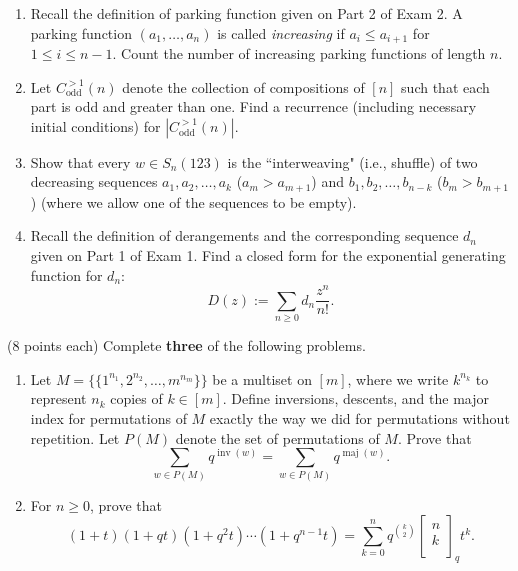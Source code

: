 \documentclass[11pt]{article}
\theoremstyle{definition}
\DeclareMathOperator{\inv}{inv}
\DeclareMathOperator{\maj}{maj}
\newcommand{\qbinom}[2]{
  \displaystyle \left[\begin{matrix}#1  \\#2  \\ \end{matrix}\right]}
\begin{document}
\begin{enumerate}
\begin{enumerate}

\item Recall the definition of parking function given on Part 2 of Exam 2.  A parking function $(a_1,\ldots,a_n)$ is called \emph{increasing} if $a_i\leq a_{i+1}$ for $1\leq i\leq n-1$. Count the number of increasing parking functions of length $n$.

\item Let $C^{>1}_{\text{odd}}(n)$ denote the collection of compositions of $[n]$  such that each part is odd and greater than one. Find a recurrence (including necessary initial conditions) for $|C^{>1}_{\text{odd}}(n)|$.

\item Show that every $w\in S_n(123)$ is the ``interweaving" (i.e., shuffle) of two decreasing sequences $a_1,a_2,\ldots, a_k$ ($a_m>a_{m+1}$) and $b_1,b_2,\ldots,b_{n-k}$ ($b_m>b_{m+1}$) (where we allow one of the sequences to be empty).

\item Recall the definition of derangements and the corresponding sequence $d_n$ given on Part 1 of Exam 1. Find a closed form for the exponential generating function for $d_n$:
\[
D(z):=\sum_{n\geq 0}d_n\frac{z^n}{n!}.
\]

\end{enumerate}

(8 points each) Complete \textbf{three} of the following problems.

\begin{enumerate}

\item Let $M= \{\{1^{n_1},2^{n_2},\ldots,m^{n_m}\}\}$ be a multiset on $[m]$, where we write $k^{n_k}$ to represent $n_k$ copies of $k\in[m]$. Define inversions, descents, and the major index for permutations of $M$ exactly the way we did for permutations without repetition. Let $P(M)$ denote the set of permutations of $M$. Prove that
\[
\sum_{w\in P(M)}q^{\inv(w)}=\sum_{w\in P(M)}q^{\maj(w)}.
\]


\item For $n\geq 0$, prove that
\[
(1+t)(1+qt)(1+q^2t)\cdots (1+q^{n-1}t)=\sum_{k=0}^nq^{\binom{k}{2}}\qbinom{n}{k}_qt^k.
\]


\end{enumerate}
\end{enumerate}
\end{document}
